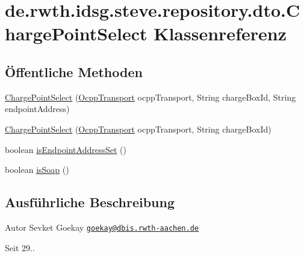 \hypertarget{classde_1_1rwth_1_1idsg_1_1steve_1_1repository_1_1dto_1_1_charge_point_select}{\section{de.\+rwth.\+idsg.\+steve.\+repository.\+dto.\+Charge\+Point\+Select Klassenreferenz}
\label{classde_1_1rwth_1_1idsg_1_1steve_1_1repository_1_1dto_1_1_charge_point_select}
}
\subsection*{Öffentliche Methoden}
\begin{DoxyCompactItemize}
\item 
\hyperlink{classde_1_1rwth_1_1idsg_1_1steve_1_1repository_1_1dto_1_1_charge_point_select_ad0cd7a65025caef02b43214960843816}{Charge\+Point\+Select} (\hyperlink{enumde_1_1rwth_1_1idsg_1_1steve_1_1ocpp_1_1_ocpp_transport}{Ocpp\+Transport} ocpp\+Transport, String charge\+Box\+Id, String endpoint\+Address)
\item 
\hyperlink{classde_1_1rwth_1_1idsg_1_1steve_1_1repository_1_1dto_1_1_charge_point_select_abe86c8f5d1ddc2910eed1201610a5fba}{Charge\+Point\+Select} (\hyperlink{enumde_1_1rwth_1_1idsg_1_1steve_1_1ocpp_1_1_ocpp_transport}{Ocpp\+Transport} ocpp\+Transport, String charge\+Box\+Id)
\item 
boolean \hyperlink{classde_1_1rwth_1_1idsg_1_1steve_1_1repository_1_1dto_1_1_charge_point_select_a1f7d0b13e760bed75b203af2b41b0b22}{is\+Endpoint\+Address\+Set} ()
\item 
boolean \hyperlink{classde_1_1rwth_1_1idsg_1_1steve_1_1repository_1_1dto_1_1_charge_point_select_abc2c6a1b288106f9a82dd089df66b6f7}{is\+Soap} ()
\end{DoxyCompactItemize}


\subsection{Ausführliche Beschreibung}
\begin{DoxyAuthor}{Autor}
Sevket Goekay \href{mailto:goekay@dbis.rwth-aachen.de}{\tt goekay@dbis.\+rwth-\/aachen.\+de} 
\end{DoxyAuthor}
\begin{DoxySince}{Seit}
29.. 
\end{DoxySince}


